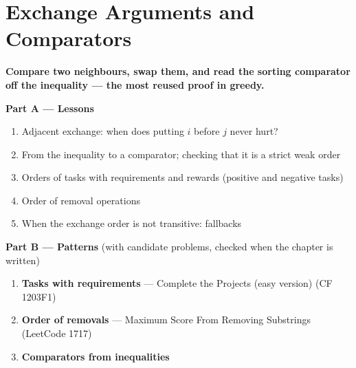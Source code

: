 \chapter{Exchange Arguments and Comparators}
\label{ch:exchange}

\begin{tcolorbox}[enhanced, colback=white, colframe=secondaryblue, boxrule=1pt, arc=2mm]
\textbf{\large\textcolor{primaryblue}{Compare two neighbours, swap them, and read the sorting comparator off the inequality --- the most reused proof in greedy.}}
\end{tcolorbox}


\begin{plannedbox}
\textbf{Part A --- Lessons}
\begin{enumerate}[leftmargin=*, label=\textbf{A\arabic*.}, itemsep=1pt]
    \item Adjacent exchange: when does putting $i$ before $j$ never hurt?
    \item From the inequality to a comparator; checking that it is a strict weak order
    \item Orders of tasks with requirements and rewards (positive and negative tasks)
    \item Order of removal operations
    \item When the exchange order is not transitive: fallbacks
\end{enumerate}
\textbf{Part B --- Patterns} (with candidate problems, checked when the chapter is written)
\begin{enumerate}[leftmargin=*, label=\textbf{P\arabic*.}, itemsep=1pt]
    \item \textbf{Tasks with requirements} --- Complete the Projects (easy version) {\small\color{darkgray}(CF 1203F1)}
    \item \textbf{Order of removals} --- Maximum Score From Removing Substrings {\small\color{darkgray}(LeetCode 1717)}
    \item \textbf{Comparators from inequalities}
\end{enumerate}
\end{plannedbox}
